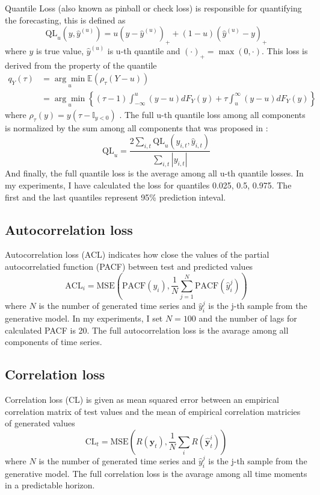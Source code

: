 \documentclass[12pt,a4paper]{article}
\begin{document}
Quantile Loss (also known as pinball or check loss) is responsible for quantifying the forecasting, this is defined as 
$$\text{QL}_{u}\left(y, \hat{y}^{(u)}\right)=u\left(y-\hat{y}^{(u)}\right)_{+}+(1-u)\left(\hat{y}^{(u)}-y\right)_{+}$$
where $y$ is true value, $\hat y^{(u)}$ is u-th quantile and $(\cdot)_+ = \max(0, \cdot)$.
This loss is derived from the property of the quantile
$$
\begin{aligned}
q_{Y}(\tau) &=\underset{u}{\arg \min } \mathbb E\left(\rho_{\tau}(Y-u)\right)\\
&=\underset{u}{\arg \min }\left\{(\tau-1) \int_{-\infty}^{u}(y-u) d F_{Y}(y)+\tau \int_{u}^{\infty}(y-u) d F_{Y}(y)\right\}    
\end{aligned}$$
where $\rho_{\tau}(y) = y(\tau - \mathbb I_{y<0})$ \cite{Koenker2005}. The full u-th quantile loss among all components is normalized by the sum among all components that was proposed in \cite{gaussiantcn2020}:
$$\text{QL}_u = \frac{2 \sum_{i,t} \text{QL}_u(y_{i,t}, \hat y_{i,t})}{\sum_{i,t} |y_{i, t}|}$$
And finally, the full quantile loss is the average among all u-th quantile losses. In my experiments, I have calculated the loss for quantiles 0.025, 0.5, 0.975. The first and the last quantiles represent 95\% prediction inteval.

\subsection{Autocorrelation loss}

Autocorrelation loss (ACL) indicates how close the values of the partial autocorrelatied function (PACF) between test and predicted values
$$\text{ACL}_i = \text{MSE}
\left(\text{PACF}(y_i), \frac{1}{N} \sum_{j=1}^N \text{PACF}(\hat y_i^j) \right)
$$
where $N$ is the number of generated time series and $\hat y_{i}^j$ is the j-th sample from the generative model. In my experiments, I set $N=100$ and the number of lags for calculated PACF is 20. The full autocorrelation loss is the avarage among all components of time series.

\subsection{Correlation loss}

Correlation loss (CL) is given as mean squared error between an empirical correlation matrix of test values and the mean of empirical correlation matricies of generated values
$$\text{CL}_t = \text{MSE} \left( R (\mathbf y_t), \frac{1}{N} \sum_i  R(\hat{\mathbf y}^i_t) \right)$$
where $N$ is the number of generated time series and $\hat y_{i}^j$ is the j-th sample from the generative model. The full correlation loss is the avarage among all time moments in a predictable horizon.
\end{document}
